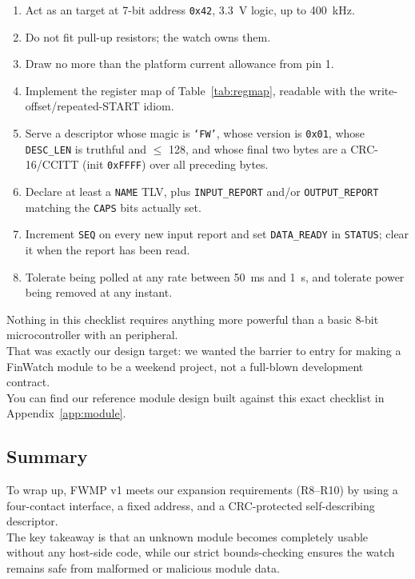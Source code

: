 \documentclass[12pt, a4paper]{article}
\begin{document}
\begin{enumerate}[label=\textbf{M\arabic*.}]
  \item Act as an  target at 7-bit address \texttt{0x42}, \SI{3.3}{\volt} logic, up to \SI{400}{\kilo\hertz}.
  \item Do not fit pull-up resistors; the watch owns them.
  \item Draw no more than the platform current allowance from pin 1.
  \item Implement the register map of Table~\ref{tab:regmap}, readable with the write-offset/repeated-START idiom.
  \item Serve a descriptor whose magic is \texttt{`FW'}, whose version is \texttt{0x01}, whose \texttt{DESC\_LEN} is truthful and $\le$ 128, and whose final two bytes are a CRC-16/CCITT (init \texttt{0xFFFF}) over all preceding bytes.
  \item Declare at least a \texttt{NAME} TLV, plus \texttt{INPUT\_REPORT} and/or \texttt{OUTPUT\_REPORT} matching the \texttt{CAPS} bits actually set.
  \item Increment \texttt{SEQ} on every new input report and set \texttt{DATA\_READY} in \texttt{STATUS}; clear it when the report has been read.
  \item Tolerate being polled at any rate between \SI{50}{\milli\second} and \SI{1}{\second}, and tolerate power being removed at any instant.
\end{enumerate}
Nothing in this checklist requires anything more powerful than a basic 8-bit microcontroller with an  peripheral. \\
That was exactly our design target: we wanted the barrier to entry for making a FinWatch module to be a weekend project, not a full-blown development contract. \\
You can find our reference module design built against this exact checklist in Appendix~\ref{app:module}.

\subsection{Summary}

To wrap up, FWMP v1 meets our expansion requirements (R8--R10) by using a four-contact interface, a fixed address, and a CRC-protected self-describing descriptor. \\
The key takeaway is that an unknown module becomes completely usable without any host-side code, while our strict bounds-checking ensures the watch remains safe from malformed or malicious module data.
\end{document}
